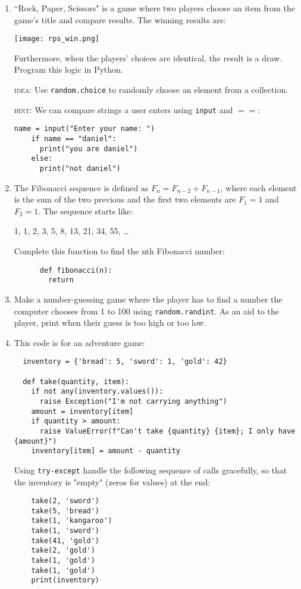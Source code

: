 \documentclass{article}
\begin{document}
  \begin{enumerate}
    \item ``Rock, Paper, Scissors" is a game where two players
      choose an item from the game's title and compare results. 
      The winning results are:

      \begin{center}
        \texttt{[image: rps\_win.png]}
      \end{center}
      Furthermore, when the players' choices are identical, the result is a draw.
      Program this logic in Python.

      \textsc{idea}: Use \texttt{random.choice} to randomly choose an element
      from a collection.

      \textsc{hint}: We can compare strings a user enters using \texttt{input} and $==$:
      \begin{verbatim}name = input("Enter your name: ")
	if name == "daniel":
	  print("you are daniel")
	else:
	  print("not daniel")
      \end{verbatim}

    \item The Fibonacci sequence is defined as $F_n = F_{n-2} + F_{n-1}$, where
    each element is the sum of the two previous and the first two elements are
    $F_1 = 1$ and $F_2 = 1$. The sequence starts like:

    \begin{center}
      1, 1, 2, 3, 5, 8, 13, 21, 34, 55, \ldots
    \end{center}

    Complete this function to find the nth Fibonacci number:
    \begin{verbatim}
      def fibonacci(n):
        return 
    \end{verbatim}

  \item Make a number-guessing game where the player has to find a number
  the computer chooses from 1 to 100 using \texttt{random.randint}. As an
  aid to the player, print when their guess is too high or too low.


  \item This code is for an adventure game:
  \begin{verbatim}
  inventory = {'bread': 5, 'sword': 1, 'gold': 42}

  def take(quantity, item):
    if not any(inventory.values()):
      raise Exception("I'm not carrying anything")
    amount = inventory[item]
    if quantity > amount:
      raise ValueError(f"Can't take {quantity} {item}; I only have {amount}")
    inventory[item] = amount - quantity
  \end{verbatim}
  
  Using \texttt{try-except} handle the following sequence of calls gracefully, 
  so that the inventory is "empty" (zeros for values) at the end:
  \begin{verbatim}
    take(2, 'sword')
    take(5, 'bread')
    take(1, 'kangaroo')
    take(1, 'sword')
    take(41, 'gold')
    take(2, 'gold')
    take(1, 'gold')
    take(1, 'gold')
    print(inventory)
  \end{verbatim}
  \end{enumerate}
\end{document}
